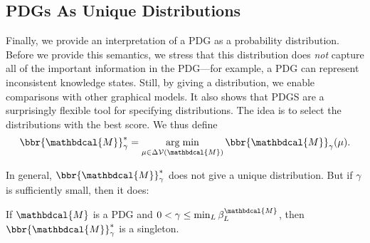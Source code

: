 \documentclass{article}
\theoremstyle{plain}
\theoremstyle{definition}
\theoremstyle{remark}
\DeclareMathOperator*{\argmin}{arg\;min}
\newcommand{\V}{\mathcal V}
\newcommand{\dg}[1]{\mathbdcal{#1}}
\newcommand{\begthm}[2]{\begin{#1}[restate=#2,label=#2]}
\numberwithin{equation}{section}
\begin{document}
    \subsection{PDGs As Unique Distributions}\label{sec:uniq-dist-semantics}

    Finally, we provide an interpretation of a PDG as a probability distribution.  
    Before we provide this semantics, we stress that
    this distribution does \emph{not} capture all of the important
    information in the PDG---for example, a PDG
    can represent inconsistent knowledge states. 
Still, by giving a distribution, we enable comparisons with other graphical models. 
It also 
 shows that PDGS are 
a surprisingly flexible tool for specifying distributions. 
The idea is to select the distributions with the best score.
We thus define 
\begin{equation}
\bbr{\dg M}_\gamma^* = \argmin_{\mu \in
				   \Delta\V(\dg M)} \bbr{\dg M}_\gamma(\mu).
\end{equation}   

In general, $\bbr{\dg M}_\gamma^*$ does not give a unique
distribution.  But if $\gamma$ is sufficiently small, then it does:
\begthm{prop}{prop:sem3}
If $\dg M$ is a PDG and $0 < \gamma \leq \min_L \beta_L^{\dg M}$, then $\bbr{\dg
M}_\gamma^*$ is a singleton. 
\end{prop}
\end{document}
